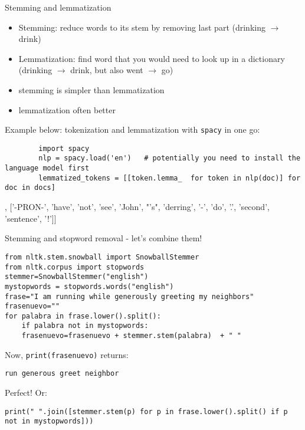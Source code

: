 \begin{frame}[fragile]{Stemming and lemmatization}
	\begin{itemize}
		\item Stemming: reduce words to its stem by removing last part (drinking $\rightarrow$ drink)
		\item Lemmatization: find word that you would need to look up in a dictionary (drinking $\rightarrow$ drink, but also went $\rightarrow$ go)
		\item stemming is simpler than lemmatization
		\item lemmatization often better
	\end{itemize}
	\pause
	
	Example below: tokenization and lemmatization with \texttt{spacy} in one go:
	\begin{lstlisting}
		import spacy
		nlp = spacy.load('en')   # potentially you need to install the language model first
		lemmatized_tokens = [[token.lemma_  for token in nlp(doc)] for doc in docs]
	\end{lstlisting}
	\begin{lstlistingoutputtiny}
		[['this', 'be', 'a', 'text'], ['-PRON-', 'have', 'not', 'see', 'John', "'s", 'derring', '-', 'do', '.', 'second', 'sentence', '!']]
	\end{lstlistingoutputtiny}
\end{frame}




\begin{frame}[fragile]{Stemming and stopword removal - let's combine them!}
	\begin{lstlisting}
from nltk.stem.snowball import SnowballStemmer
from nltk.corpus import stopwords
stemmer=SnowballStemmer("english")
mystopwords = stopwords.words("english")
frase="I am running while generously greeting my neighbors"
frasenuevo=""
for palabra in frase.lower().split():
	if palabra not in mystopwords:
	frasenuevo=frasenuevo + stemmer.stem(palabra)  + " "
\end{lstlisting}
Now, {\tt{print(frasenuevo)}} returns:
\begin{lstlisting}
run generous greet neighbor
	\end{lstlisting}
	Perfect!
	\pause
	\small
	Or:
	\begin{lstlisting}
print(" ".join([stemmer.stem(p) for p in frase.lower().split() if p not in mystopwords]))
	\end{lstlisting}
	
\end{frame}

